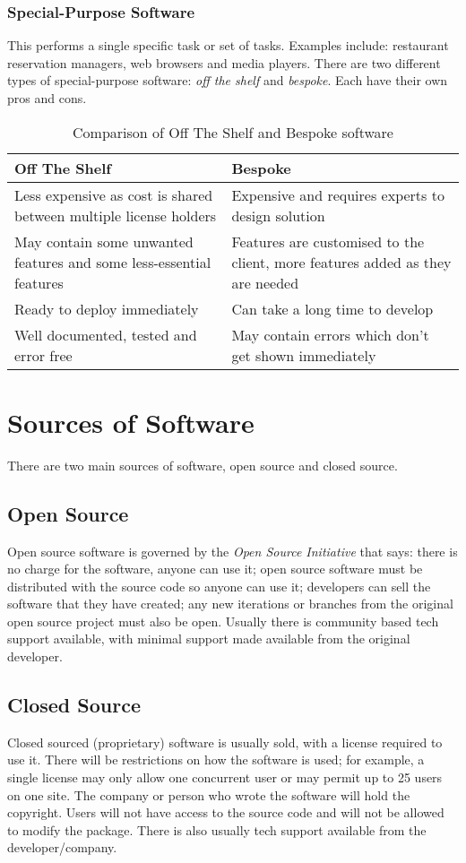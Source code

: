 \documentclass[a4paper,11pt, twocolumn]{article}
\begin{document}
\subsubsection{Special-Purpose Software}
This performs a single specific task or set of tasks. Examples include: restaurant reservation managers, web browsers and media players. There are two different types of special-purpose software: \textit{off the shelf} and \textit{bespoke}. Each have their own pros and cons.
\begin{table}[H]
    \centering
    \begin{tabularx}{0.45\textwidth}{X|X}
        \textbf{Off The Shelf} & \textbf{Bespoke}\\
        \hline
        Less expensive as cost is shared between multiple license holders & Expensive and requires experts to design solution\\
        \hline
        May contain some unwanted features and some less-essential features & Features are customised to the client, more features added as they are needed\\
        \hline
        Ready to deploy immediately & Can take a long time to develop\\
        \hline
        Well documented, tested and error free & May contain errors which don't get shown immediately
    \end{tabularx}
    \caption{Comparison of Off The Shelf and Bespoke software}
\end{table}

\section{Sources of Software}
There are two main sources of software, open source and closed source.
\subsection{Open Source}
Open source software is governed by the \textit{Open Source Initiative} that says: there is no charge for the software, anyone can use it; open source software must be distributed with the source code so anyone can use it; developers can sell the software that they have created; any new iterations or branches from the original open source project must also be open. Usually there is community based tech support available, with minimal support made available from the original developer.
\subsection{Closed Source}
Closed sourced (proprietary) software is usually sold, with a license required to use it. There will be restrictions on how the software is used; for example, a single license may only allow one concurrent user or may permit up to 25 users on one site. The company or person who wrote the software will hold the copyright. Users will not have access to the source code and will not be allowed to modify the package. There is also usually tech support available from the developer/company.
\end{document}
